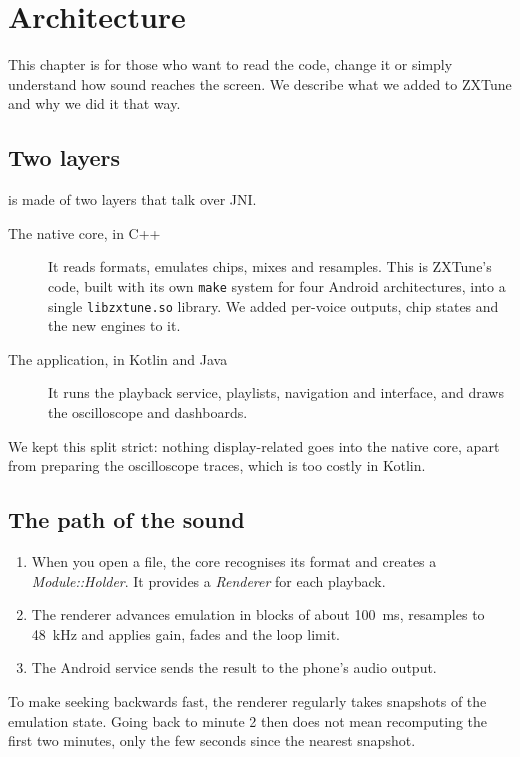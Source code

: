 \chapter{Architecture}\label{chap:architecture}

This chapter is for those who want to read the code, change it or simply understand how sound reaches the screen. We
describe what we added to ZXTune and why we did it that way.

\section{Two layers}
\soft is made of two layers that talk over JNI.
\begin{description}
  \item[The native core, in C++] It reads formats, emulates chips, mixes and resamples. This is ZXTune's code, built
        with its own \texttt{make} system for four Android architectures, into a single \texttt{libzxtune.so}
        library. We added per-voice outputs, chip states and the new engines to it.
  \item[The application, in Kotlin and Java] It runs the playback service, playlists, navigation and interface, and
        draws the oscilloscope and dashboards.
\end{description}
We kept this split strict: nothing display-related goes into the native core, apart from preparing the oscilloscope
traces, which is too costly in Kotlin.

\section{The path of the sound}
\begin{enumerate}
  \item When you open a file, the core recognises its format and creates a \emph{Module::Holder}. It provides a
        \emph{Renderer} for each playback.
  \item The renderer advances emulation in blocks of about 100~ms, resamples to 48~kHz and applies gain, fades and
        the loop limit.
  \item The Android service sends the result to the phone's audio output.
\end{enumerate}
To make seeking backwards fast, the renderer regularly takes snapshots of the emulation state. Going back to minute 2
then does not mean recomputing the first two minutes, only the few seconds since the nearest snapshot.

